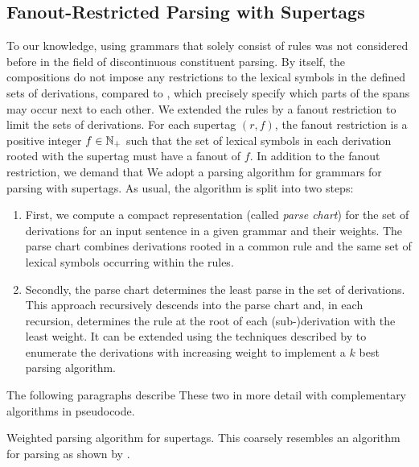 \documentclass[../../document.tex]{subfiles}
\begin{document}
    \subsection{Fanout-Restricted Parsing with  Supertags}\label{sec:parsing:dcp}
    To our knowledge, using grammars that solely consist of  rules was not considered before in the field of discontinuous constituent parsing.
    By itself, the  compositions do not impose any restrictions to the lexical symbols in the defined sets of derivations, compared to , which precisely specify which parts of the spans may occur next to each other.
    We extended the rules by a fanout restriction to limit the sets of derivations.
    For each  supertag \((r, f)\), the fanout restriction is a positive integer \(f \in \mathbb{N}_+\) such that the set of lexical symbols in each derivation rooted with the supertag must have a fanout of \(f\).
    In addition to the fanout restriction, we demand that 
    We adopt a parsing algorithm for  grammars for parsing with  supertags.
    As usual, the algorithm is split into two steps:
    \begin{enumerate}
        \item \label{step:parsing:chart}
            First, we compute a compact representation (called \emph{parse chart}) for the set of derivations for an input sentence in a given grammar and their weights.
            The parse chart combines derivations rooted in a common rule and the same set of lexical symbols occurring within the rules.
        \item \label{step:parsing:derivation}
            Secondly, the parse chart determines the least parse in the set of derivations.
            This approach recursively descends into the parse chart and, in each recursion, determines the rule at the root of each (sub-)derivation with the least weight.
            It can be extended using the techniques described by \citet{HuaChia05} to enumerate the derivations with increasing weight to implement a \(k\) best parsing algorithm.
    \end{enumerate}
    The following paragraphs describe These two in more detail with complementary algorithms in pseudocode.
    
    \begin{algorithm}
        \caption{\label{alg:parsing:chart}
            Weighted parsing algorithm for  supertags.
            This coarsely resembles an algorithm for parsing  as shown by \citet[the ``na\"ive algorithm'' in section~3]{Burden05}.
        }
        
    \end{algorithm}
    
\end{document}
